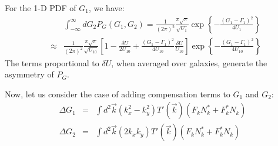 \documentclass[onecolumn]{aastex62}
\begin{document}
For the 1-D PDF of $G_1$, we have:
\begin{eqnarray}
\label{1d_PDF}
&&\int_{-\infty}^{\infty}dG_2 P_G\left(G_1,G_2\right)
=\frac{1}{(2\pi)^2}\frac{\pi\sqrt{\pi}}{\sqrt{U_1}}\exp\left\{-\frac{\left(G_1-\Gamma_1\right)^2}{4U_1}\right\}\\ \nonumber
&\approx&\frac{1}{(2\pi)^2}\frac{\pi\sqrt{\pi}}{\sqrt{U_{10}}}\left[1-\frac{\delta U}{2U_{10}}+\frac{\left(G_1-\Gamma_1\right)^2}{4U_{10}}\frac{\delta U}{U_{10}}\right]\exp\left\{-\frac{\left(G_1-\Gamma_1\right)^2}{4U_{10}}\right\}
\end{eqnarray}
The terms proportional to $\delta U$, when averaged over galaxies, generate the asymmetry of $P_G$.

Now, let us consider the case of adding compensation terms to $G_1$ and $G_2$:
\begin{eqnarray}
\Delta G_1&=&\int{d}^2\vec{k}\left(k_x^2-k_y^2\right)T'(\vec{k})\left(F_kN_k^*+F_k^*N_k\right) \\ \nonumber
\Delta G_2&=&\int{d}^2\vec{k}\left(2k_xk_y\right)T'(\vec{k})\left(F_kN_k^*+F_k^*N_k\right) 
\end{eqnarray}
\end{document}
